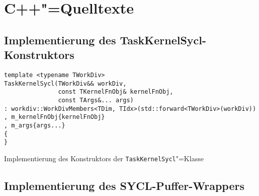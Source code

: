 \section{C++"=Quelltexte}
\label{anhang:source:cpp}

\subsection{Implementierung des TaskKernelSycl-Konstruktors}
\label{anhang:source:cpp:taskkernelsyclkonst}

\begin{code}
    \begin{verbatim}
template <typename TWorkDiv>
TaskKernelSycl(TWorkDiv&& workDiv,
               const TKernelFnObj& kernelFnObj,
               const TArgs&... args)
: workdiv::WorkDivMembers<TDim, TIdx>(std::forward<TWorkDiv>(workDiv))
, m_kernelFnObj{kernelFnObj}
, m_args{args...}
{
}
    \end{verbatim}
    \caption{Implementierung des Konstruktors der \texttt{TaskKernelSycl}"=Klasse}
\end{code}

\subsection{Implementierung des SYCL-Puffer-Wrappers}
\label{anhang:source:cpp:bufferwrapper}


